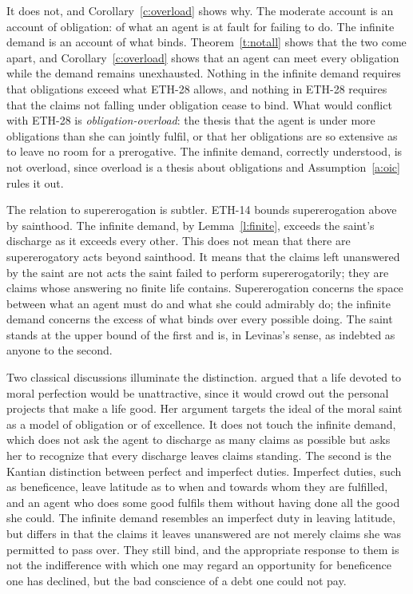 \documentclass{situationist-preprint}
\begin{document}
It does not, and Corollary~\ref{c:overload} shows why. The moderate account is an account of obligation: of what an agent is at fault for failing to do. The infinite demand is an account of what binds. Theorem~\ref{t:notall} shows that the two come apart, and Corollary~\ref{c:overload} shows that an agent can meet every obligation while the demand remains unexhausted. Nothing in the infinite demand requires that obligations exceed what ETH-28 allows, and nothing in ETH-28 requires that the claims not falling under obligation cease to bind. What would conflict with ETH-28 is \emph{obligation-overload}: the thesis that the agent is under more obligations than she can jointly fulfil, or that her obligations are so extensive as to leave no room for a prerogative. The infinite demand, correctly understood, is not overload, since overload is a thesis about obligations and Assumption~\ref{a:oic} rules it out.

The relation to supererogation is subtler. ETH-14 bounds supererogation above by sainthood. The infinite demand, by Lemma~\ref{l:finite}, exceeds the saint's discharge as it exceeds every other. This does not mean that there are supererogatory acts beyond sainthood. It means that the claims left unanswered by the saint are not acts the saint failed to perform supererogatorily; they are claims whose answering no finite life contains. Supererogation concerns the space between what an agent must do and what she could admirably do; the infinite demand concerns the excess of what binds over every possible doing. The saint stands at the upper bound of the first and is, in Levinas's sense, as indebted as anyone to the second.

Two classical discussions illuminate the distinction. \citet{Wolf1982} argued that a life devoted to moral perfection would be unattractive, since it would crowd out the personal projects that make a life good. Her argument targets the ideal of the moral saint as a model of obligation or of excellence. It does not touch the infinite demand, which does not ask the agent to discharge as many claims as possible but asks her to recognize that every discharge leaves claims standing. The second is the Kantian distinction between perfect and imperfect duties. Imperfect duties, such as beneficence, leave latitude as to when and towards whom they are fulfilled, and an agent who does some good fulfils them without having done all the good she could. The infinite demand resembles an imperfect duty in leaving latitude, but differs in that the claims it leaves unanswered are not merely claims she was permitted to pass over. They still bind, and the appropriate response to them is not the indifference with which one may regard an opportunity for beneficence one has declined, but the bad conscience of a debt one could not pay.
\end{document}
